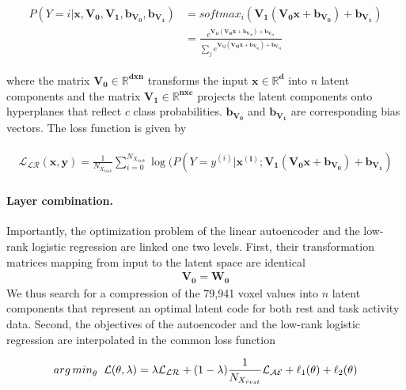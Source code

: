 \documentclass{article} %
\begin{document}
\begin{eqnarray}
  \begin{split}
    P(Y=i|\mathbf{x, V_0,V_1,b_{V_0}, b_{V_1}}) &= softmax_i(\mathbf{V_1 (V_0 x + b_{V_0}) + b_{V_1}}) \\
    &= \frac {e^{\mathbf{V_{1i} (V_{0i} x + b_{V_{0i}}) + b_{V_{1i}}}}} {\sum_j e^{\mathbf{V_{1j} (V_{0j} x + b_{V_{0j}}) + b_{V_{1j}}}}}            
  \end{split}
  \label{eq:lr}
\end{eqnarray}

where the matrix $\mathbf{V_0 \in \mathbb{R}^{dxn}}$
transforms the input $\mathbf{x \in \mathbb{R}^{d}}$
into $n$ latent components
and the matrix $\mathbf{V_1 \in \mathbb{R}^{nxc}}$
projects the latent components
onto hyperplanes that reflect $c$ class probabilities.
$\mathbf{b_{V_0}}$ and $\mathbf{b_{V_1}}$ are corresponding
bias vectors.
The loss function is given by

\begin{eqnarray}
  \begin{split}
    {\mathcal{L_{LR}}}(\mathbf{x, y}) = \frac{1}{N_{X_{task}}} \sum_{i=0}^{N_{X_{task}}} \log(P(Y=y^{(i)}|\mathbf{x^{(i)}; V_1 (V_0 x + b_{V_0}) + b_{V_1}})
\end{split}
\label{eq:lr_loss}
\end{eqnarray}

\paragraph{Layer combination.}
Importantly, the optimization problem of the linear autoencoder
and the low-rank logistic regression
are linked one two levels. First, their transformation matrices mapping from
input to the latent space are identical
\begin{eqnarray}
  \mathbf{V_0} = \mathbf{W_0}
\end{eqnarray}
We thus search for a compression of the 79,941 voxel values into $n$ latent
components that represent an optimal latent code for both
rest and task activity data.
Second, the objectives of the autoencoder and the low-rank
logistic regression are interpolated in the common loss function

\begin{eqnarray}
  \begin{split}
{arg\,min}_\theta \hspace{0.2cm} {\mathcal{L}}(\theta, \lambda) = \lambda {\mathcal{L_{LR}}}
+ (1-\lambda)\frac{1}{N_{X_{rest}}} {\mathcal{L_{AE}}} + \ell_1(\theta) + \ell_2(\theta)
  \label{eq:loss_equ}
\end{split}
\end{eqnarray}
\end{document}
